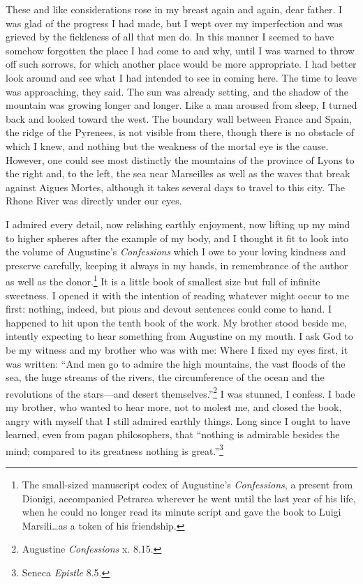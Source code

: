 These and like considerations rose in my breast again and again, dear
father. I was glad of the progress I had made, but I wept over my
imperfection and was grieved by the fickleness of all that men do. In
this manner I seemed to have somehow forgotten the place I had come to
and why, until I was warned to throw off such sorrows, for which
another place would be more appropriate. I had better look around and
see what I had intended to see in coming here. The time to leave was
approaching, they said. The sun was already setting, and the shadow of
the mountain was growing longer and longer. Like a man aroused from
sleep, I turned back and looked toward the west. The boundary wall
between France and Spain, the ridge of the Pyrenees, is not visible
from there, though there is no obstacle of which I knew, and nothing
but the weakness of the mortal eye is the cause. However, one could
see most distinctly the mountains of the province of Lyons to the
right and, to the  left, the sea near Marseilles as well as
the waves that break against Aigues Mortes, although it takes several
days to travel to this city. The Rhone River was directly under our
eyes.


I admired every detail, now relishing earthly enjoyment, now lifting
up my mind to higher spheres after the example of my body, and I
thought it fit to look into the volume of Augustine's
\textit{Confessions} which I owe to your loving kindness and preserve
carefully, keeping it always in my hands, in remembrance of the author
as well as the donor.\footnote{The small-sized manuscript codex of
Augustine's \textit{Confessions}, a present from Dionigi, accompanied
Petrarca wherever he went until the last year of his life, when he
could no longer read its minute script and gave the book to Luigi
Marsili\ldots as a token of his friendship.} It is a little book of
smallest size but full of infinite sweetness. I opened it with the
intention of reading whatever might occur to me first: nothing,
indeed, but pious and devout sentences could come to hand. I happened
to hit upon the tenth book of the work. My brother stood beside me,
intently expecting to hear something from Augustine on my mouth. I ask
God to be my witness and my brother who was with me: Where I fixed my
eyes first, it was written: ``And men go to admire the high mountains,
the vast floods of the sea, the huge streams of the rivers, the
circumference of the ocean and the revolutions of the stars---and
desert themselves.''\footnote{Augustine \textit{Confessions} x. 8.15.}
I was stunned, I confess. I bade my brother, who wanted to hear more,
not to molest me, and closed the book, angry with myself that I still
admired earthly things. Long since I ought to have learned, even
from pagan philosophers, that ``nothing is admirable besides the mind;
compared to its greatness nothing is great.''\footnote{Seneca
\textit{Epistle} 8.5.}

